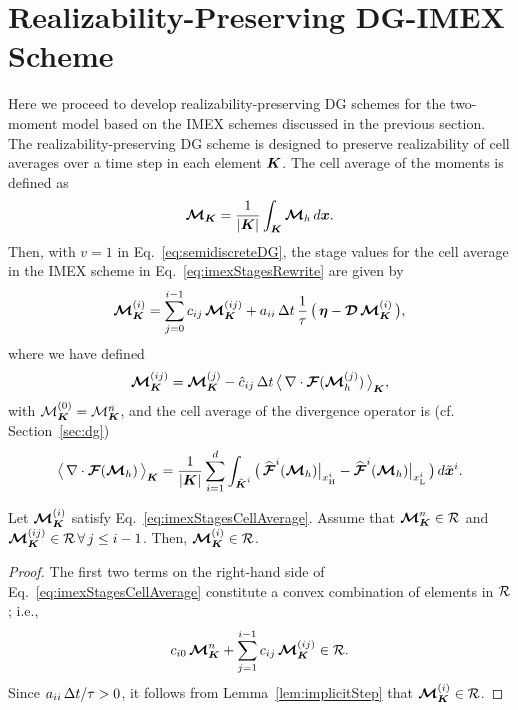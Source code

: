 \section{Realizability-Preserving DG-IMEX Scheme}
\label{sec:realizableDGIMEX}

Here we proceed to develop realizability-preserving DG schemes for the two-moment model based on the IMEX schemes discussed in the previous section.  
The realizability-preserving DG scheme is designed to preserve realizability of cell averages over a time step in each element $\boldsymbol{K}$.  
The cell average of the moments is defined as
\begin{equation}
  \boldsymbol{\mathcal{M}}_{\boldsymbol{K}}
  =\frac{1}{|\boldsymbol{K}|}\int_{\boldsymbol{K}}\boldsymbol{\mathcal{M}}_{h}\,d\boldsymbol{x}.  
\end{equation}
Then, with $v=1$ in Eq.~\eqref{eq:semidiscreteDG}, the stage values for the cell average in the IMEX scheme in Eq.~\eqref{eq:imexStagesRewrite} are given by
\begin{equation}
  \boldsymbol{\mathcal{M}}_{\boldsymbol{K}}^{(i)}
  =\sum_{j=0}^{i-1}c_{ij}\,\boldsymbol{\mathcal{M}}_{\boldsymbol{K}}^{(ij)}
  +a_{ii}\,\Delta t\,\frac{1}{\tau}\,\big(\,\boldsymbol{\eta}-\boldsymbol{\mathcal{D}}\,\boldsymbol{\mathcal{M}}_{\boldsymbol{K}}^{(i)}\,\big),
  \label{eq:imexStagesCellAverage}
\end{equation}
where we have defined
\begin{equation}
  \boldsymbol{\mathcal{M}}_{\boldsymbol{K}}^{(ij)}
  =\boldsymbol{\mathcal{M}}_{\boldsymbol{K}}^{(j)}-\hat{c}_{ij}\,\Delta t\,\big\langle\,\nabla\cdot\boldsymbol{\mathcal{F}}(\boldsymbol{\mathcal{M}}_{h}^{(j)})\,\big\rangle_{\boldsymbol{K}},
\end{equation}
with $\mathcal{M}_{\boldsymbol{K}}^{(0)}=\mathcal{M}_{\boldsymbol{K}}^{n}$, and the cell average of the divergence operator is (cf. Section~\ref{sec:dg})
\begin{equation}
  \big\langle\,\nabla\cdot\boldsymbol{\mathcal{F}}(\boldsymbol{\mathcal{M}}_{h})\,\big\rangle_{\boldsymbol{K}}
  =\frac{1}{|\boldsymbol{K}|}\sum_{i=1}^{d}\int_{\tilde{\boldsymbol{K}}^{i}}
  \big(\,\widehat{\boldsymbol{\mathcal{F}}}^{i}(\boldsymbol{\mathcal{M}}_{h})\big|_{x_{\mbox{\tiny H}}^{i}}-\widehat{\boldsymbol{\mathcal{F}}}^{i}(\boldsymbol{\mathcal{M}}_{h})\big|_{x_{\mbox{\tiny L}}^{i}}\,\big)\,d\tilde{\boldsymbol{x}}^{i}.  
\end{equation}

\begin{lemma}
  Let $\boldsymbol{\mathcal{M}}_{\boldsymbol{K}}^{(i)}$ satisfy Eq.~\eqref{eq:imexStagesCellAverage}.
  Assume that $\boldsymbol{\mathcal{M}}_{\boldsymbol{K}}^{n}\in\mathcal{R}$ and $\boldsymbol{\mathcal{M}}_{\boldsymbol{K}}^{(ij)}\in\mathcal{R}\,\forall\,j\le i-1$.  
  Then, $\boldsymbol{\mathcal{M}}_{\boldsymbol{K}}^{(i)}\in\mathcal{R}$.  
\end{lemma}
\begin{proof}
  The first two terms on the right-hand side of Eq.~\eqref{eq:imexStagesCellAverage} constitute a convex combination of elements in $\mathcal{R}$; i.e.,
  \begin{equation*}
    c_{i0}\,\boldsymbol{\mathcal{M}}_{\boldsymbol{K}}^{n}+\sum_{j=1}^{i-1}c_{ij}\,\boldsymbol{\mathcal{M}}_{\boldsymbol{K}}^{(ij)}\in\mathcal{R}.
  \end{equation*}
  Since $a_{ii}\,\Delta t/\tau>0$, it follows from Lemma~\ref{lem:implicitStep} that $\boldsymbol{\mathcal{M}}_{\boldsymbol{K}}^{(i)}\in\mathcal{R}$.  
\end{proof}

